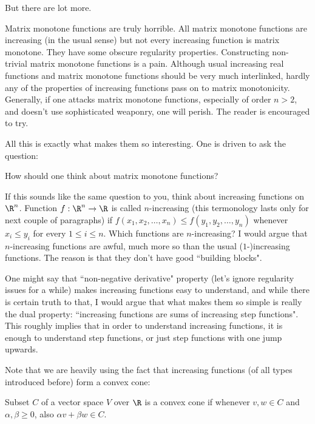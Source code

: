 But there are lot more.

Matrix monotone functions are truly horrible. All matrix monotone functions are increasing (in the usual sense) but not every increasing function is matrix monotone. They have some obscure regularity properties. Constructing non-trivial matrix monotone functions is a pain. Although usual increasing real functions and matrix monotone functions should be very much interlinked, hardly any of the properties of increasing functions pass on to matrix monotonicity. Generally, if one attacks matrix monotone functions, especially of order $n > 2$, and doesn't use sophisticated weaponry, one will perish. The reader is encouraged to try.

All this is exactly what makes them so interesting. One is driven to ask the question:

\begin{quest}
	How should one think about matrix monotone functions?
\end{quest}

If this sounds like the same question to you, think about increasing functions on $\R^n$. Function $f : \R^n \to \R$ is called $n$-increasing (this termonology lasts only for next couple of paragraphs) if $f(x_{1}, x_{2}, \ldots, x_{n}) \leq f(y_{1}, y_{2}, \ldots, y_{n})$ whenever $x_{i} \leq y_{i}$ for every $1 \leq i \leq n$. Which functions are $n$-increasing? I would argue that $n$-increasing functions are awful, much more so than the usual ($1$-)increasing functions. The reason is that they don't have good ``building blocks".

One might say that ``non-negative derivative" property (let's ignore regularity issues for a while) makes increasing functions easy to understand, and while there is certain truth to that, I would argue that what makes them so simple is really the dual property: ``increasing functions are sums of increasing step functions". This roughly implies that in order to understand increasing functions, it is enough to understand step functions, or just step functions with one jump upwards.

Note that we are heavily using the fact that increasing functions (of all types introduced before) form a convex cone:

\begin{maar}
	Subset $C$ of a vector space $V$ over $\R$ is a convex cone if whenever $v, w \in C$ and $\alpha, \beta \geq 0$, also $\alpha v + \beta w \in C$.
\end{maar}

